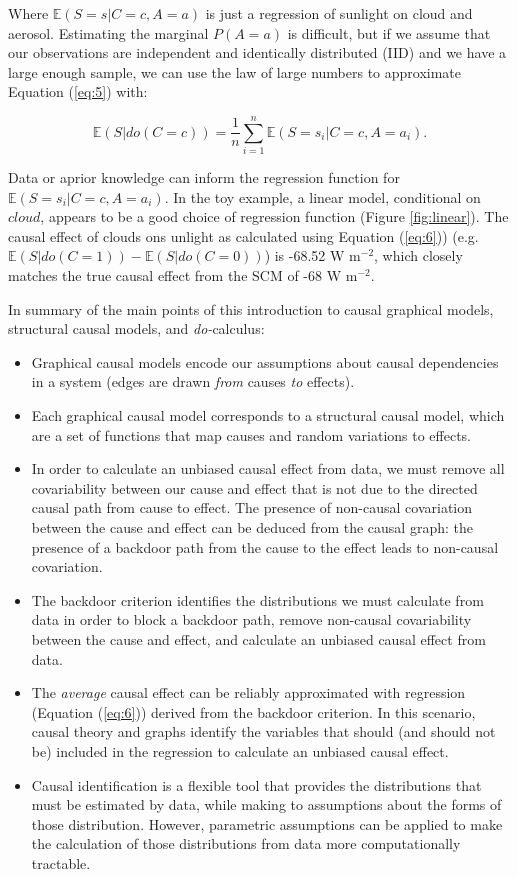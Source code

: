 \documentclass[12pt]{article}
\begin{document}
Where $\mathbb{E}(S=s | C=c, A=a)$ is just a regression of sunlight on
cloud and aerosol. Estimating the marginal $P(A=a)$ is difficult, but
if we assume that our observations are independent and identically
distributed (IID) and we have a large enough sample, we can use the
law of large numbers to approximate Equation (\ref{eq:5}) with:

\begin{equation}
  \mathbb{E}(S | do(C = c))  = \frac{1}{n} \sum_{i=1}^n \mathbb{E}(S=s_i |
  C=c, A=a_i).
  \label{eq:6}
\end{equation}

Data or aprior knowledge can inform the regression function for
$\mathbb{E}(S=s_i | C=c, A=a_i)$. In the toy example, a linear model,
conditional on $cloud$, appears to be a good choice of regression
function (Figure \ref{fig:linear}). The causal effect of clouds ons
unlight as calculated using Equation (\ref{eq:6})) (e.g.
$\mathbb{E}(S | do(C = 1)) - \mathbb{E}(S | do(C = 0))$) is -68.52 W
m$^{-2}$, which closely matches the true causal effect from the SCM of
-68 W m$^{-2}$.

In summary of the main points of this introduction to causal graphical
models, structural causal models, and \textit{do-}calculus:

\begin{itemize}
\item Graphical causal models encode our assumptions about causal
  dependencies in a system (edges are drawn \emph{from} causes
  \emph{to} effects).
\item Each graphical causal model corresponds to a structural causal
  model, which are a set of functions that map causes and random
  variations to effects.
\item In order to calculate an unbiased causal effect from data, we
  must remove all covariability between our cause and effect that is
  not due to the directed causal path from cause to effect. The
  presence of non-causal covariation between the cause and effect
  can be deduced from the causal graph: the presence of a backdoor
  path from the cause to the effect leads to non-causal covariation.
\item The backdoor criterion identifies the distributions we must
  calculate from data in order to block a backdoor path, remove
  non-causal covariability between the cause and effect, and
  calculate an unbiased causal effect from data.
\item The \emph{average} causal effect can be reliably approximated
  with regression (Equation (\ref{eq:6})) derived from the backdoor
  criterion. In this scenario, causal theory and graphs identify the
  variables that should (and should not be) included in the
  regression to calculate an unbiased causal effect.
\item Causal identification is a flexible tool that provides the
  distributions that must be estimated by data, while making to
  assumptions about the forms of those distribution. However,
  parametric assumptions can be applied to make the calculation of
  those distributions from data more computationally tractable.
\end{itemize}
\end{document}
